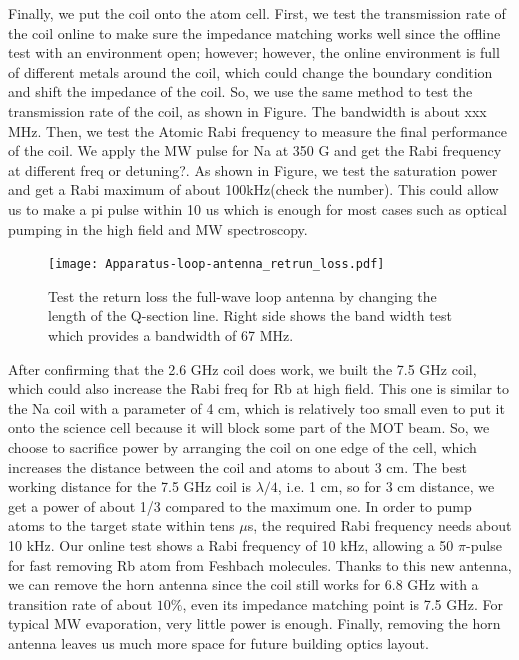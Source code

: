 Finally, we put the coil onto the atom cell. First, we test the transmission rate of the coil online to make sure the impedance matching works well since the offline test with an environment open; however; however, the online environment is full of different metals around the coil, which could change the boundary condition and shift the impedance of the coil. So, we use the same method to test the transmission rate of the coil, as shown in Figure. The bandwidth is about xxx MHz. Then, we test the Atomic Rabi frequency to measure the final performance of the coil. We apply the MW pulse for Na at 350 G and get the Rabi frequency at different freq or detuning?. As shown in Figure, we test the saturation power and get a Rabi maximum of about 100kHz(check the number). This could allow us to make a pi pulse within 10 us which is enough for most cases such as optical pumping in the high field and MW spectroscopy.

\begin{figure}[htb]
\begin{center}
\texttt{[image: Apparatus-loop-antenna\_retrun\_loss.pdf]}
\end{center}
\caption[Test of the return loss by changing the lengths of the Q-sections]{Test the return loss the full-wave loop antenna by changing the length of the Q-section line. Right side shows the band width test which provides a bandwidth of 67 MHz. }  
\label{antenna_return_loss}
\end{figure}

After confirming that the 2.6 GHz coil does work, we built the 7.5 GHz coil, which could also increase the Rabi freq for Rb at high field. This one is similar to the Na coil with a parameter of 4 cm, which is relatively too small even to put it onto the science cell because it will block some part of the MOT beam. So, we choose to sacrifice power by arranging the coil on one edge of the cell, which increases the distance between the coil and atoms to about 3 cm. The best working distance for the 7.5 GHz coil is \(\lambda/4\), i.e. 1 cm, so for 3 cm distance, we get a power of about 1/3 compared to the maximum one. In order to pump atoms to the target state within tens $\mu$s, the required Rabi frequency needs about 10 kHz. Our online test shows a Rabi frequency of 10 kHz, allowing a 50 $\pi$-pulse for fast removing Rb atom from Feshbach molecules. Thanks to this new antenna, we can remove the horn antenna since the coil still works for 6.8 GHz with a transition rate of about \(10\%\), even its impedance matching point is 7.5 GHz. For typical MW evaporation, very little power is enough. Finally, removing the horn antenna leaves us much more space for future building optics layout.

